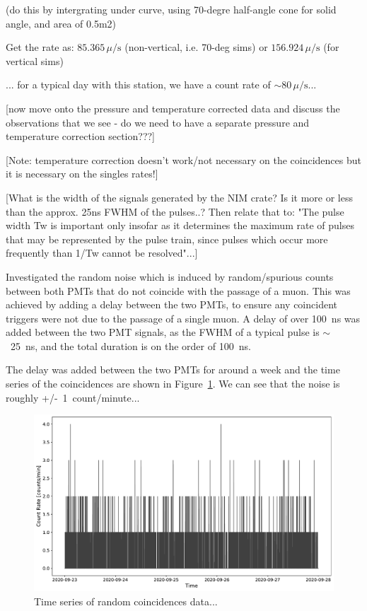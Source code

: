 (do this by intergrating under curve, using 70-degre half-angle cone for solid angle, and area of 0.5m2)

Get the rate as: $85.365 \, \mu/\mathrm{s}$ (non-vertical, i.e. 70-deg sims) or $156.924 \, \mu/\mathrm{s}$ (for vertical sims)

... for a typical day with this station, we have a count rate of $\sim 80 \, \mu/\mathrm{s}$...


[now move onto the pressure and temperature corrected data and discuss the observations that we see - do we need to have a separate pressure and temperature correction section???]

[Note: temperature correction doesn't work/not necessary on the coincidences but it is necessary on the singles rates!]


[What is the width of the signals generated by the NIM crate? Is it more or less than the approx. 25ns FWHM of the pulses..? Then relate that to: "The pulse width Tw is important only insofar as it determines the maximum rate of pulses that may be represented by the pulse train, since pulses which occur more frequently than 1/Tw cannot be resolved"...]


Investigated the random noise which is induced by random/spurious counts between both PMTs that do not coincide with the passage of a muon. This was achieved by adding a delay between the two PMTs, to ensure any coincident triggers were not due to the passage of a single muon. A delay of over 100~ns was added between the two PMT signals, as the FWHM of a typical pulse is $\sim$~25~ns, and the total duration is on the order of 100~ns.

The delay was added between the two PMTs for around a week and the time series of the coincidences are shown in Figure~\ref{fig:random_coinciences}. We can see that the noise is roughly +/-~1~count/minute...

\begin{figure}[ht!]
	\centering
	\includegraphics[width=0.6\columnwidth]{random_noise_timeseries.pdf}
	\caption{Time series of random coincidences data...}
	\label{fig:random_coinciences}
\end{figure}

